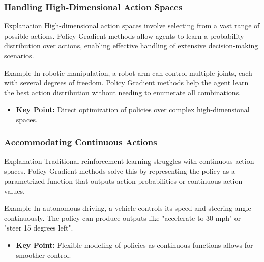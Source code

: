 \documentclass{beamer}
\begin{document}
\begin{frame}[fragile]
    \frametitle{Handling High-Dimensional Action Spaces}
    
    \begin{block}{Explanation}
        High-dimensional action spaces involve selecting from a vast range of possible actions. 
        Policy Gradient methods allow agents to learn a probability distribution over actions, 
        enabling effective handling of extensive decision-making scenarios.
    \end{block}
    
    \begin{block}{Example}
        In robotic manipulation, a robot arm can control multiple joints, each with several degrees of freedom. 
        Policy Gradient methods help the agent learn the best action distribution without needing to enumerate all combinations.
    \end{block}
    
    \begin{itemize}
        \item \textbf{Key Point:} Direct optimization of policies over complex high-dimensional spaces.
    \end{itemize}
\end{frame}

\begin{frame}[fragile]
    \frametitle{Accommodating Continuous Actions}
    
    \begin{block}{Explanation}
        Traditional reinforcement learning struggles with continuous action spaces. 
        Policy Gradient methods solve this by representing the policy as a parametrized function 
        that outputs action probabilities or continuous action values.
    \end{block}
    
    \begin{block}{Example}
        In autonomous driving, a vehicle controls its speed and steering angle continuously. 
        The policy can produce outputs like "accelerate to 30 mph" or "steer 15 degrees left".
    \end{block}
    
    \begin{itemize}
        \item \textbf{Key Point:} Flexible modeling of policies as continuous functions allows for smoother control.
    \end{itemize}
\end{frame}
\end{document}
